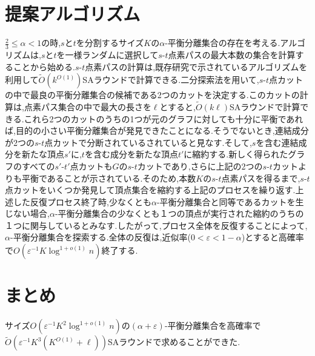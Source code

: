 \documentclass[a4j,twoside]{jarticle}
\begin{document}
\begin{論文概要}
\section{提案アルゴリズム}
$\frac{2}{3} \leq \alpha < 1$の時,$s$と$t$を分割するサイズ$K$の$\alpha$-平衡分離集合の存在を考える.アルゴリズムは,$s$と$t$を一様ランダムに選択して$s$-$t$点素パスの最大本数の集合を計算することから始める.$s$-$t$点素パスの計算は,既存研究で示されているアルゴリズム\cite{li2018distributed}を利用して$\tilde{O}(k^{O(1)})$SAラウンドで計算できる.二分探索法を用いて,$s$-$t$点カットの中で最良の平衡分離集合の候補である2つのカットを決定する.このカットの計算は,点素パス集合の中で最大の長さを$\ell$とすると,$\tilde{O}(k\ell)$SAラウンドで計算できる.これら2つのカットのうちの1つが元のグラフに対しても十分に平衡であれば,目的の小さい平衡分離集合が発見できたことになる.そうでないとき,連結成分が2つの$s$-$t$点カットで分断されているされていると見なす.そして,$s$を含む連結成分を新たな頂点$s'$に,$t$を含む成分を新たな頂点$t'$に縮約する.新しく得られたグラフのすべての$s'$-$t'$点カットも$G$の$s$-$t$カットであり,さらに上記の2つの$s$-$t$カットよりも平衡であることが示されている.そのため,本数$K$の$s$-$t$点素パスを得るまで,$s$-$t$点カットをいくつか発見して頂点集合を縮約する上記のプロセスを繰り返す.上述した反復プロセス終了時,少なくとも$\alpha$-平衡分離集合と同等であるカットを生じない場合,$\alpha$-平衡分離集合の少なくとも１つの頂点が実行された縮約のうちの１つに関与しているとみなす.したがって,プロセス全体を反復することによって,$\alpha$-平衡分離集合を探索する.全体の反復は,近似率($0 < \varepsilon < 1-\alpha$)とすると高確率で$O(\varepsilon^{-1}K\log^{1+o(1)}n)$終了する.
\section{まとめ}
サイズ$O(\varepsilon^{-1}K^2\log^{1+o(1)}n)$の$(\alpha + \varepsilon)$-平衡分離集合を高確率で$\tilde{O}(\varepsilon^{-1}K^3(K^{O(1)}+\ell))$SAラウンドで求めることができた.


\clearpage                       %
\end{論文概要}                   %
\end{document}

